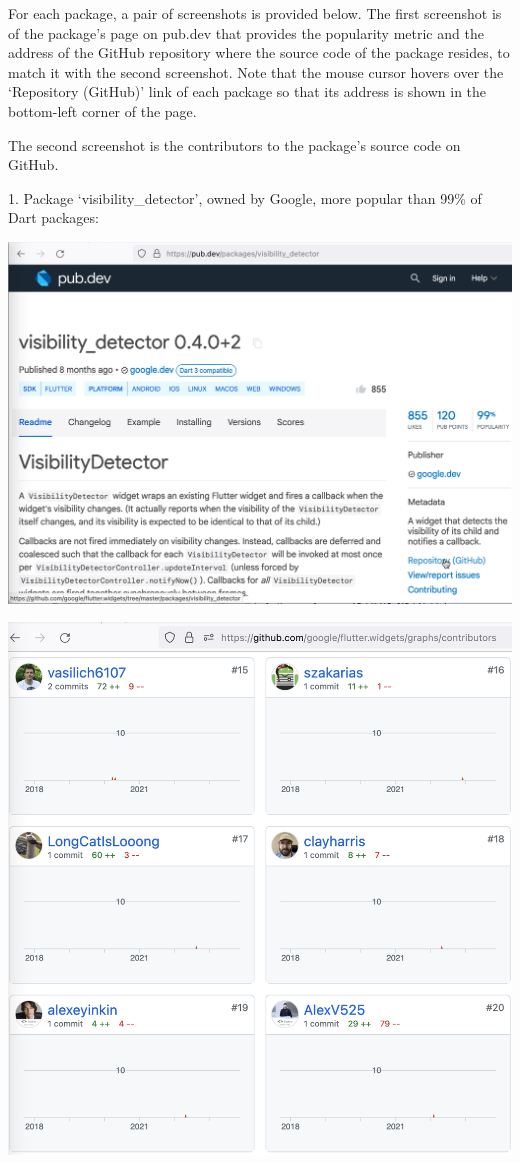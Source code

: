 
For each package, a pair of screenshots is provided below.
The first screenshot is of the package's page on pub.dev that provides the popularity metric
and the address of the GitHub repository where the source code of the package resides,
to match it with the second screenshot.
Note that the mouse cursor hovers over the `Repository (GitHub)' link of each package
so that its address is shown in the bottom-left corner of the page.

The second screenshot is the contributors to the package's source code on GitHub.

1. Package `visibility\_detector', owned by Google, more popular than 99\% of Dart packages:

\includegraphics[width=\textwidth]{visibility_detector}
\pagebreak

\includegraphics[width=\textwidth]{visibility_detector_contributors}
\pagebreak

